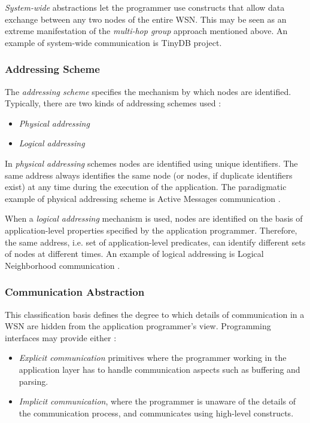 \emph{System-wide} abstractions let the
  programmer use constructs that allow data exchange between any two nodes
  of the entire WSN. This may be seen as an extreme manifestation of the
  \emph{multi-hop group} approach mentioned above. An example of system-wide
  communication is TinyDB \cite{madden_TinyDB:2005} project.
  
\subsubsection{Addressing Scheme}

The \emph{addressing scheme} specifies the mechanism by which nodes are
identified. Typically, there are two kinds of addressing schemes used
\cite{mottola_middleware:2008}:

\begin{itemize}
  \item \emph{Physical addressing}
  \item \emph{Logical addressing}
\end{itemize}

In \emph{physical addressing} schemes nodes are identified using unique 
  identifiers. The same address always identifies the same node (or nodes, if
  duplicate  identifiers exist) at any time during the execution of the
  application. The paradigmatic example of physical addressing scheme is Active
  Messages communication \cite{activemessagesEicken:2001}.

When a \emph{logical addressing} mechanism is used, nodes are identified on the
basis of application-level properties specified by the application
programmer. Therefore, the same address, i.e. set of
application-level predicates, can identify different sets of nodes at different
times. An example of logical addressing is Logical Neighborhood communication
\cite{mottola_LN:2006}.

\subsubsection{Communication Abstraction}

This classification basis defines the degree to which details of communication
in a WSN are hidden from the application programmer's view. Programming
interfaces may provide either \cite{mottola_middleware:2008}:
\begin{itemize}
  \item \emph{Explicit communication} primitives where the
  programmer working in the application layer has to handle communication
  aspects such as buffering and parsing. 
  \item \emph{Implicit communication}, where the programmer is unaware of the
  details of the communication process, and communicates using
  high-level constructs.
\end{itemize}

